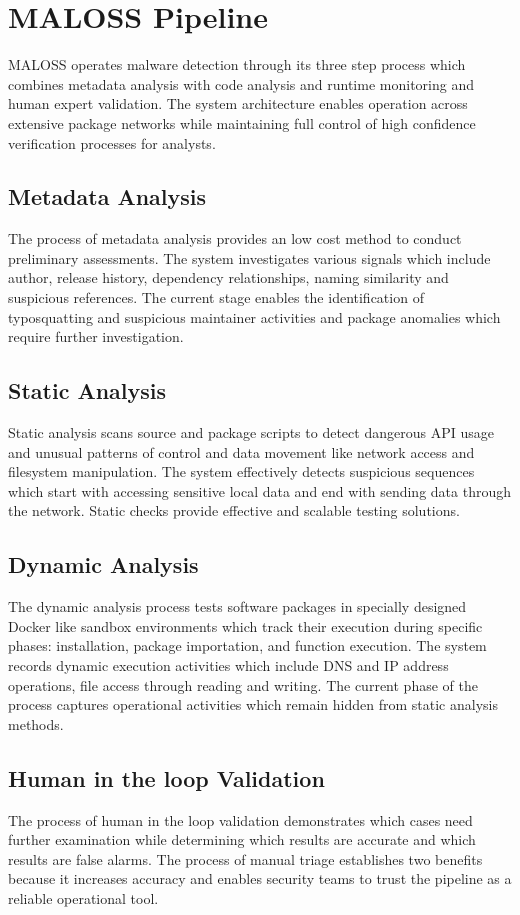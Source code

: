 \section{MALOSS Pipeline}

MALOSS operates malware detection through its three step process which combines metadata analysis with code analysis and runtime monitoring and human expert validation. The system architecture enables operation across extensive package networks while maintaining full control of high confidence verification processes for analysts.

\subsection{Metadata Analysis}
The process of metadata analysis provides an low cost method to conduct preliminary assessments. The system investigates various signals which include author, release history, dependency relationships, naming similarity and suspicious references. The current stage enables the identification of typosquatting and suspicious maintainer activities and package anomalies which require further investigation.

\subsection{Static Analysis}
Static analysis scans source and package scripts to detect dangerous API usage and unusual patterns of control and data movement like network access and filesystem manipulation. The system effectively detects suspicious sequences which start with accessing sensitive local data and end with sending data through the network. Static checks provide effective and scalable testing solutions.

\subsection{Dynamic Analysis}
The dynamic analysis process tests software packages in specially designed Docker like sandbox environments which track their execution during specific phases: installation, package importation, and function execution. The system records dynamic execution activities which include DNS and IP address operations, file access through reading and writing. The current phase of the process captures operational activities which remain hidden from static analysis methods.

\subsection{Human in the loop Validation}
The process of human in the loop validation demonstrates which cases need further examination while determining which results are accurate and which results are false alarms. The process of manual triage establishes two benefits because it increases accuracy and enables security teams to trust the pipeline as a reliable operational tool.

